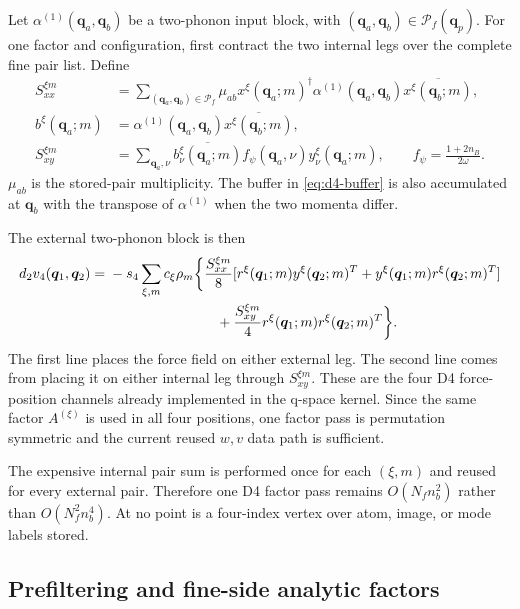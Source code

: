 \documentclass{article}
\newcommand{\Nf}{N_f}
\begin{document}
Let $\alpha^{(1)}(\bm q_a,\bm q_b)$ be a two-phonon input block, with
$(\bm q_a,\bm q_b)\in\mathcal P_f(\bm q_p)$. For one factor and
configuration, first contract the two internal legs over the complete fine
pair list. Define
\begin{align}
    S_{xx}^{\xi m}
    &=
    \sum_{(\bm q_a,\bm q_b)\in\mathcal P_f}
    \mu_{ab}
    x^\xi(\bm q_a;m)^\dagger
    \alpha^{(1)}(\bm q_a,\bm q_b)
    \overline{x^\xi(\bm q_b;m)},
    \label{eq:d4-internal-xx}\\
    b^\xi(\bm q_a;m)
    &=
    \alpha^{(1)}(\bm q_a,\bm q_b)
    \overline{x^\xi(\bm q_b;m)},
    \label{eq:d4-buffer}\\
    S_{xy}^{\xi m}
    &=
    \sum_{\bm q_a,\nu}
    \overline{b_\nu^\xi(\bm q_a;m)}
    f_\psi(\bm q_a,\nu)
    y_\nu^\xi(\bm q_a;m),
    \qquad
    f_\psi=\frac{1+2n_B}{2\omega}.
    \label{eq:d4-internal-xy}
\end{align}
$\mu_{ab}$ is the stored-pair multiplicity. The buffer in
\autoref{eq:d4-buffer} is also accumulated at $\bm q_b$ with the transpose
of $\alpha^{(1)}$ when the two momenta differ.

The external two-phonon block is then
\begin{align}
    d_2v_4(\bm q_1,\bm q_2)
    ={}&-s_4
    \sum_{\xi,m}c_\xi\rho_m
    \biggl\{
    \frac{S_{xx}^{\xi m}}{8}
    [r^\xi(\bm q_1;m)y^\xi(\bm q_2;m)^T
    +y^\xi(\bm q_1;m)r^\xi(\bm q_2;m)^T]
    \nonumber\\
    &\hspace{27mm}
    +\frac{S_{xy}^{\xi m}}{4}
    r^\xi(\bm q_1;m)r^\xi(\bm q_2;m)^T
    \biggr\}.
    \label{eq:fine-d4-action}
\end{align}
The first line places the force field on either external leg. The second
line comes from placing it on either internal leg through
$S_{xy}^{\xi m}$. These are the four D4 force-position channels already
implemented in the q-space kernel. Since the same factor $A^{(\xi)}$ is
used in all four positions, one factor pass is permutation symmetric and
the current reused $w,v$ data path is sufficient.

The expensive internal pair sum is performed once for each
$(\xi,m)$ and reused for every external pair. Therefore one D4 factor pass
remains $O(\Nf n_b^2)$ rather than $O(\Nf^2 n_b^4)$. At no point is a
four-index vertex over atom, image, or mode labels stored.

\subsection{Prefiltering and fine-side analytic factors}
\label{sec:fine-prefilter}
\end{document}
